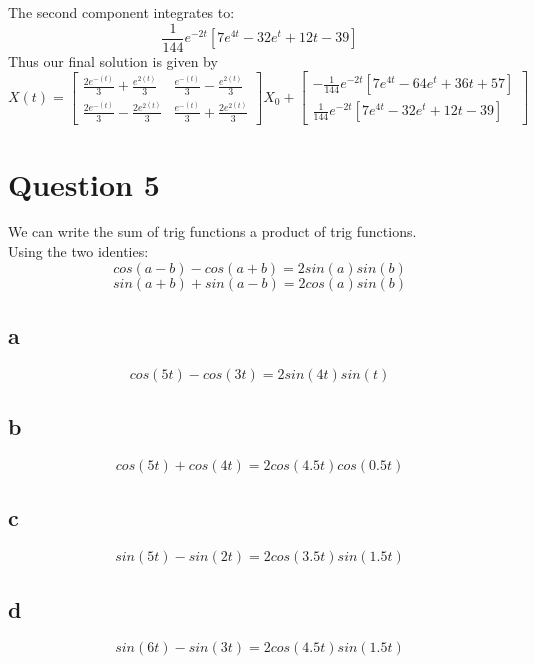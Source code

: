 \documentclass{article}
\begin{document}
The second component integrates to:
$$ \frac{1}{144}  e^{-2t}[7e^{4t}-32e^{t}+12t-39]$$
Thus our final solution is given by
$$X(t) = \begin{bmatrix}
    \frac{2e^{-(t)}}{3} + \frac{e^{2(t)}}{3} & \frac{e^{-(t)}}{3} - \frac{e^{2(t)}}{3}\\
    \frac{2e^{-(t)}}{3} - \frac{2e^{2(t)}}{3} & \frac{e^{-(t)}}{3} + \frac{2e^{2(t)}}{3}
\end{bmatrix}  X_0 + \begin{bmatrix}
    -\frac{1}{144}  e^{-2t}[7e^{4t}-64e^{t}+36t+57] \\
    \frac{1}{144}  e^{-2t}[7e^{4t}-32e^{t}+12t-39]
\end{bmatrix}
$$
\section*{Question 5}
We can write the sum of trig functions a product of trig functions. \\
Using the two identies: 
$$cos(a-b)-cos(a+b) = 2sin(a)sin(b)$$
$$sin(a+b) + sin(a-b) = 2cos(a)sin(b)$$

\subsection*{a}
$$cos(5t) - cos(3t) = 2sin(4t)sin(t)$$
\subsection*{b}
$$cos(5t) + cos(4t) = 2cos(4.5t)cos(0.5t)$$
\subsection*{c}
$$sin(5t) - sin(2t) = 2cos(3.5t)sin(1.5t)$$
\subsection*{d}
$$sin(6t) - sin(3t) = 2cos(4.5t)sin(1.5t)$$
\end{document}
